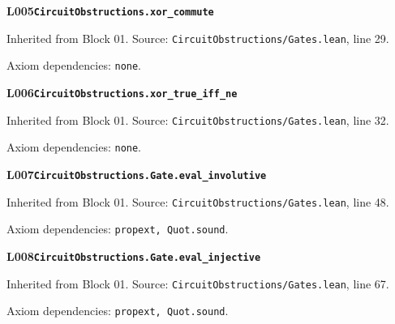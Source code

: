 \begin{minipage}{\linewidth}
\hypertarget{L005}{}
{\small\sffamily\bfseries\color{ink}L005\quad\nolinkurl{CircuitObstructions.xor_commute}}\par
{\scriptsize\sffamily\color{muted}Inherited from Block 01. Source: \nolinkurl{CircuitObstructions/Gates.lean}, line 29.}\par
{}
{\scriptsize\sffamily\color{muted}Axiom dependencies: \nolinkurl{none}.}
\end{minipage}\par\medskip
\begin{minipage}{\linewidth}
\hypertarget{L006}{}
{\small\sffamily\bfseries\color{ink}L006\quad\nolinkurl{CircuitObstructions.xor_true_iff_ne}}\par
{\scriptsize\sffamily\color{muted}Inherited from Block 01. Source: \nolinkurl{CircuitObstructions/Gates.lean}, line 32.}\par
{}
{\scriptsize\sffamily\color{muted}Axiom dependencies: \nolinkurl{none}.}
\end{minipage}\par\medskip
{}\par\medskip
\begin{minipage}{\linewidth}
\hypertarget{L007}{}
{\small\sffamily\bfseries\color{ink}L007\quad\nolinkurl{CircuitObstructions.Gate.eval_involutive}}\par
{\scriptsize\sffamily\color{muted}Inherited from Block 01. Source: \nolinkurl{CircuitObstructions/Gates.lean}, line 48.}\par
{}
{\scriptsize\sffamily\color{muted}Axiom dependencies: \nolinkurl{propext, Quot.sound}.}
\end{minipage}\par\medskip
\begin{minipage}{\linewidth}
\hypertarget{L008}{}
{\small\sffamily\bfseries\color{ink}L008\quad\nolinkurl{CircuitObstructions.Gate.eval_injective}}\par
{\scriptsize\sffamily\color{muted}Inherited from Block 01. Source: \nolinkurl{CircuitObstructions/Gates.lean}, line 67.}\par
{}
{\scriptsize\sffamily\color{muted}Axiom dependencies: \nolinkurl{propext, Quot.sound}.}
\end{minipage}\par\medskip
